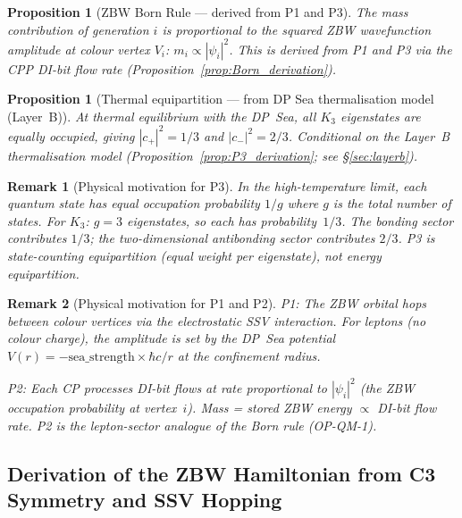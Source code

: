 \documentclass[11pt]{article}
\newtheorem{remark}{Remark}[section]
\newtheorem{proposition}[theorem]{Proposition}
\newcommand{\ZBW}{\mathrm{ZBW}}
\begin{document}
\begin{proposition}[$\ZBW$ Born Rule --- derived from P1 and P3]
\label{prop:Born}
The mass contribution of generation $i$ is proportional to the squared
ZBW wavefunction amplitude at colour vertex $V_i$:
$m_i \propto |\psi_i|^2$.
This is derived from P1 and P3 via the CPP DI-bit flow rate
(Proposition~\ref{prop:Born_derivation}).
\end{proposition}

\begin{proposition}[Thermal equipartition --- from DP Sea thermalisation model (Layer~B)]
\label{post:equip}
At thermal equilibrium with the DP~Sea, all $K_3$ eigenstates are equally
occupied, giving $|c_+|^2 = 1/3$ and $|c_-|^2 = 2/3$.
Conditional on the Layer~B thermalisation model
(Proposition~\ref{prop:P3_derivation}; see \S\ref{sec:layerb}).
\end{proposition}

\begin{remark}[Physical motivation for P3]
In the high-temperature limit, each quantum state has equal occupation
probability $1/g$ where $g$ is the total number of states.
For $K_3$: $g = 3$ eigenstates, so each has probability~$1/3$.
The bonding sector contributes $1/3$; the two-dimensional antibonding
sector contributes $2/3$.  P3 is state-counting equipartition (equal
weight per eigenstate), not energy equipartition.
\end{remark}

\begin{remark}[Physical motivation for P1 and P2]
P1: The ZBW orbital hops between colour vertices via the electrostatic
SSV interaction.  For leptons (no colour charge), the amplitude is set
by the DP~Sea potential $V(r) = -\mathrm{sea\_strength}\times\hbar c/r$
at the confinement radius.

P2: Each CP processes DI-bit flows at rate proportional to $|\psi_i|^2$
(the ZBW occupation probability at vertex~$i$).  Mass = stored ZBW energy
$\propto$ DI-bit flow rate.  P2 is the lepton-sector analogue of the
Born rule (OP-QM-1).
\end{remark}

\subsection*{Derivation of the ZBW Hamiltonian from C3 Symmetry and SSV Hopping}
\label{prop:P1_derivation}
\end{document}

